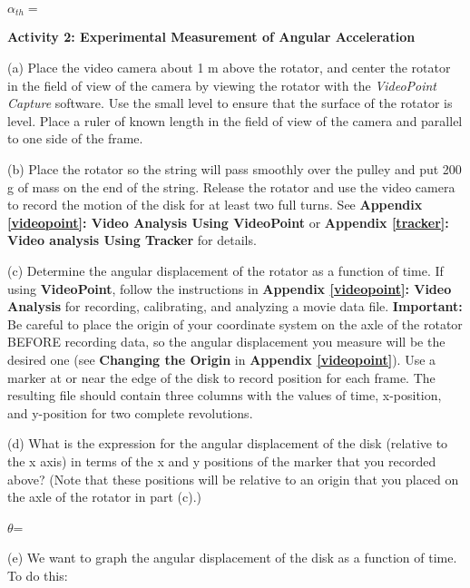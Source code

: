 \( \alpha _{th}= \)
\answerspace{5mm}

\textbf{Activity 2: Experimental Measurement of Angular Acceleration} 

(a) Place the video camera about 1 m above the rotator, and center the rotator in the field of view of the camera by viewing the rotator with the \textit{VideoPoint Capture} software. Use the small level to ensure that the surface of the rotator is level. Place a ruler of known length in the field of view of the camera and parallel to one side of the frame.

(b) Place the rotator so the string will pass smoothly over the pulley and put
200 g of mass on the end of the string. Release the rotator and use the
video camera to record the motion of the disk for at least two full turns. See
\textbf{Appendix \ref{videopoint}: Video Analysis Using VideoPoint} or 
\textbf{Appendix \ref{tracker}: Video analysis Using Tracker} for details.

(c) Determine the angular displacement of the rotator as a function of time. If using \textbf{VideoPoint}, follow the instructions in \textbf{Appendix \ref{videopoint}: Video Analysis} for recording, calibrating, and analyzing a movie data file. \textbf{Important:} Be careful to place the origin of your coordinate system on the axle of the rotator BEFORE recording data, so the angular displacement you measure will be the desired one (see \textbf{Changing the Origin} in \textbf{Appendix \ref{videopoint}}). Use a marker at or near the edge of the disk to record position for each frame. The resulting file should contain three columns with the values of time, x-position, and y-position for two complete revolutions.

\pagebreak[2]
(d) What is the expression for the angular displacement of the disk (relative to the x axis) in terms of the x and y positions of the marker that you recorded above? (Note that these positions will be relative to an origin that you placed on the axle of the rotator in part (c).)
\vspace{5mm}

\( \theta  \)= 
\bigskip

(e) We want to graph the angular displacement of the disk as a function of time.
To do this:

